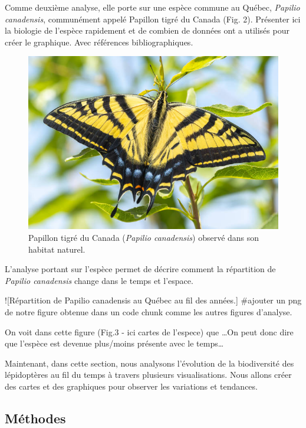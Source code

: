 \documentclass[9pt,twocolumn,twoside,]{pnas-new}
\begin{document}
Comme deuxième analyse, elle porte sur une espèce commune au Québec,
\emph{Papilio canadensis}, communément appelé Papillon tigré du Canada
(Fig. 2). Présenter ici la biologie de l'espèce rapidement et de combien
de données ont a utilisés pour créer le graphique. Avec références
bibliographiques.

\begin{figure}
\centering
\includegraphics{Papilio_canadensis.png}
\caption{Papillon tigré du Canada (\emph{Papilio canadensis}) observé
dans son habitat naturel.}
\end{figure}

L'analyse portant sur l'espèce permet de décrire comment la répartition
de \emph{Papilio canadensis} change dans le temps et l'espace.

!{[}Répartition de Papilio canadensis au Québec au fil des années.{}{]}
\#ajouter un png de notre figure obtenue dans un code chunk comme les
autres figures d'analyse.

On voit dans cette figure (Fig.3 - ici cartes de l'espece) que \ldots On
peut donc dire que l'espèce est devenue plus/moins présente avec le
temps\ldots{}

Maintenant, dans cette section, nous analysons l'évolution de la
biodiversité des lépidoptères au fil du temps à travers plusieurs
visualisations. Nous allons créer des cartes et des graphiques pour
observer les variations et tendances.

\subsection{\texorpdfstring{\textbf{Méthodes}}{Méthodes}}\label{muxe9thodes}
\end{document}

